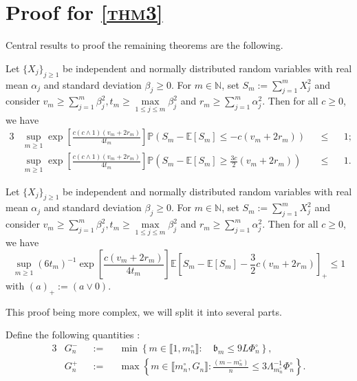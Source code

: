 \section{Proof for \textsc{\cref{thm3}}}

Central results to proof the remaining theorems are the following.
\begin{lm}\label{lm3}
Let $\{X_{j}\}_{j \geq 1}$ be independent and normally distributed random variables with real mean $\alpha_{j}$ and standard deviation $\beta_{j} \geq 0$. For $m \in \mathds{N}$, set $S_{m} := \sum \limits_{j = 1}^{m} X_{j}^{2}$ and consider $v_{m} \geq \sum\limits_{j = 1}^{m} \beta_{j}^{2}, t_{m} \geq \max \limits_{1 \leq j \leq m} \beta_{j}^{2}$ and $r_{m} \geq \sum\limits_{j = 1}^{m} \alpha_{j}^{2}$.
Then for all $c \geq 0$, we have
\begin{alignat*}{3}
&\sup\limits_{m \geq 1} \exp\left[\frac{c (c \wedge 1) (v_{m} + 2 r_{m})}{4 t_{m}}\right]\mathds{P}\left(S_{m} - \mathds{E}[S_{m}] \leq - c (v_{m} + 2 r_{m})\right) &&\leq&& 1; \\
&\sup\limits_{m \geq 1} \exp\left[\frac{c (c \wedge 1) (v_{m} + 2 r_{m})}{4 t_{m}}\right]\mathds{P}\left(S_{m} - \mathds{E}[S_{m}] \geq \frac{3 c}{2} (v_{m} + 2 r_{m})\right) &&\leq&& 1.
\end{alignat*}
\end{lm}

\begin{lm}\label{lm4}
Let $\{X_{j}\}_{j \geq 1}$ be independent and normally distributed random variables with real mean $\alpha_{j}$ and standard deviation $\beta_{j} \geq 0$. For $m \in \mathds{N}$, set $S_{m} := \sum \limits_{j = 1}^{m} X_{j}^{2}$ and consider $v_{m} \geq \sum\limits_{j = 1}^{m} \beta_{j}^{2}, t_{m} \geq \max \limits_{1 \leq j \leq m} \beta_{j}^{2}$ and $r_{m} \geq \sum\limits_{j = 1}^{m} \alpha_{j}^{2}$.
Then for all $c \geq 0$, we have
\[\sup\limits_{m \geq 1}(6 t_{m})^{-1} \exp\left[\frac{c (v_{m} + 2 r_{m})}{4 t_{m}}\right] \mathds{E}\left[S_{m} - \mathds{E}[S_{m}] - \frac{3}{2} c (v_{m} + 2 r_{m})\right]_{+} \leq 1\]
with $(a)_{+} := (a \vee 0).$
\end{lm}

This proof being more complex, we will split it into several parts.

\begin{de}\label{de2}
Define the following quantities :
\begin{alignat*}{3}
& G_{n}^{-} &&:=&& \min\left\{m \in \llbracket 1, m_{n}^{\circ} \rrbracket : \quad \mathfrak{b}_{m} \leq 9 L \Phi_{n}^{\circ}\right\},\\
& G_{n}^{+} &&:=&& \max \left\{m \in \llbracket m_{n}^{\circ}, G_{n} \rrbracket : \frac{\left( m - m_{n}^{\circ} \right)}{n} \leq 3 \Lambda_{m_{n}^{\circ}}^{-1} \Phi_{n}^{\circ}\right\}.
\end{alignat*}
\end{de}


